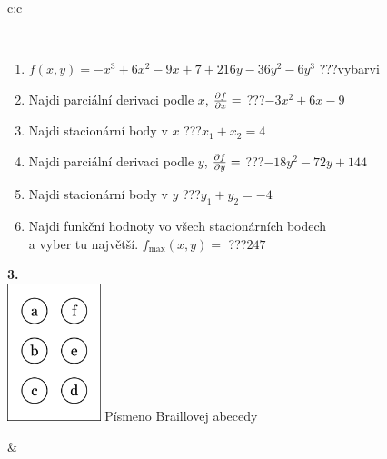 \documentclass[10pt]{report}
\begin{document}
\begin{tabular}{c:c}
\begin{minipage}[c][104.5mm][t]{0.5\linewidth}
\begin{center}
\begin{minipage}{0.95\linewidth}
\begin{center}
\end{center}
\end{minipage}
\\[1mm]
\begin{minipage}{0.79\linewidth}
\begin{center}
\begin{varwidth}{\linewidth}
\begin{enumerate}
\normalsize
\item $f(x,y)=-x^3+6x^2-9x+7+216y-36y^2-6y^3$\quad \dotfill\; ???\;\dotfill \quad vybarvi
\item Najdi parciální derivaci podle $x$, $\pdv{f}{x}=$\quad \dotfill\; ???\;\dotfill \quad $-3x^2+6x-9$
\item Najdi stacionární body v $x$\quad \dotfill\; ???\;\dotfill \quad $x_1+x_2=4$
\item Najdi parciální derivaci podle $y$, $\pdv{f}{y}=$\quad \dotfill\; ???\;\dotfill \quad $-18y^2-72y+144$
\item Najdi stacionární body v $y$\quad \dotfill\; ???\;\dotfill \quad $y_1+y_2=-4$
\item Najdi funkční hodnoty vo všech stacionárních bodech \\ \phantom{xxxxxx} a vyber tu najvětší. $f_{\text{max}}(x,y)=$\quad \dotfill\; ???\;\dotfill \quad $247$
\end{enumerate}
\end{varwidth}
\end{center}
\end{minipage}
\begin{minipage}{0.20\linewidth}
\begin{center}
{\Huge\bfseries 3.} \\[2mm]
\includegraphics[height=40mm]{../images/braille.png}
{\small Písmeno Braillovej abecedy}
\end{center}
\end{minipage}
\end{center}
\end{minipage}
&
\begin{minipage}[c][104.5mm][t]{0.5\linewidth}
\begin{center}

\end{center}
\end{minipage}
\end{tabular}
\end{document}
